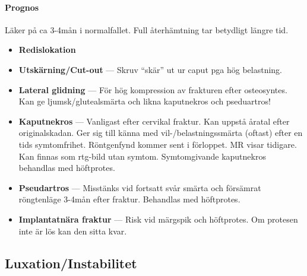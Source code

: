 \documentclass[
  letterpaper,
  DIV=11,
  numbers=noendperiod]{scrreport}
\let\oldparagraph\paragraph
\renewcommand{\paragraph}[1]{\oldparagraph{#1}\mbox{}}
\providecommand{\tightlist}{%
  \setlength{\itemsep}{0pt}\setlength{\parskip}{0pt}}\usepackage{longtable,booktabs,array}
\begin{document}
\hypertarget{prognos-10}{%
\paragraph{Prognos}\label{prognos-10}}

Läker på ca 3-4mån i normalfallet. Full återhämtning tar betydligt
längre tid.

\begin{tcolorbox}[enhanced jigsaw, colback=white, colbacktitle=quarto-callout-warning-color!10!white, toptitle=1mm, arc=.35mm, toprule=.15mm, rightrule=.15mm, titlerule=0mm, breakable, bottomrule=.15mm, colframe=quarto-callout-warning-color-frame, left=2mm, opacityback=0, coltitle=black, title=\textcolor{quarto-callout-warning-color}{\faExclamationTriangle}\hspace{0.5em}{Komplikationer}, leftrule=.75mm, bottomtitle=1mm, opacitybacktitle=0.6]

\begin{itemize}
\tightlist
\item
  \textbf{Redislokation}
\item
  \textbf{Utskärning/Cut-out} --- Skruv ``skär'' ut ur caput pga hög
  belastning.
\item
  \textbf{Lateral glidning} --- För hög kompression av frakturen efter
  osteosyntes. Kan ge ljumsk/glutealsmärta och likna kaputnekros och
  pseduartros!
\item
  \textbf{Kaputnekros} --- Vanligast efter cervikal fraktur. Kan uppstå
  åratal efter originalskadan. Ger sig till känna med
  vil-/belastningssmärta (oftast) efter en tids symtomfrihet.
  Röntgenfynd kommer sent i förloppet. MR visar tidigare. Kan finnas som
  rtg-bild utan symtom. Symtomgivande kaputnekros behandlas med
  höftprotes.
\item
  \textbf{Pseudartros} --- Misstänks vid fortsatt svår smärta och
  försämrat röngtenläge 3-4mån efter fraktur. Behandlas med höftprotes.
\item
  \textbf{Implantatnära fraktur} --- Risk vid märgspik och höftprotes.
  Om protesen inte är lös kan den sitta kvar.
\end{itemize}

\end{tcolorbox}

\hypertarget{luxationinstabilitet}{%
\subsection{Luxation/Instabilitet}\label{luxationinstabilitet}}
\end{document}
